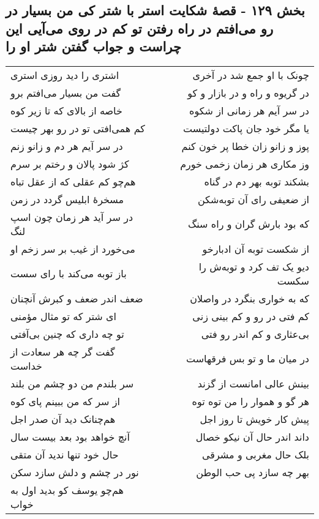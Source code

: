 \begin{center}
\section*{بخش ۱۲۹ - قصهٔ شکایت استر با شتر کی من بسیار در رو می‌افتم در راه رفتن تو کم در روی می‌آیی این چراست و جواب گفتن شتر او را}
\label{sec:sh129}
\begin{longtable}{l p{0.5cm} r}
اشتری را دید روزی استری
&&
چونک با او جمع شد در آخری
\\
گفت من بسیار می‌افتم برو
&&
در گریوه و راه و در بازار و کو
\\
خاصه از بالای که تا زیر کوه
&&
در سر آیم هر زمانی از شکوه
\\
کم همی‌افتی تو در رو بهر چیست
&&
یا مگر خود جان پاکت دولتیست
\\
در سر آیم هر دم و زانو زنم
&&
پوز و زانو زان خطا پر خون کنم
\\
کژ شود پالان و رختم بر سرم
&&
وز مکاری هر زمان زخمی خورم
\\
هم‌چو کم عقلی که از عقل تباه
&&
بشکند توبه بهر دم در گناه
\\
مسخرهٔ ابلیس گردد در زمن
&&
از ضعیفی رای آن توبه‌شکن
\\
در سر آید هر زمان چون اسپ لنگ
&&
که بود بارش گران و راه سنگ
\\
می‌خورد از غیب بر سر زخم او
&&
از شکست توبه آن ادبارخو
\\
باز توبه می‌کند با رای سست
&&
دیو یک تف کرد و توبه‌ش را سکست
\\
ضعف اندر ضعف و کبرش آنچنان
&&
که به خواری بنگرد در واصلان
\\
ای شتر که تو مثال مؤمنی
&&
کم فتی در رو و کم بینی زنی
\\
تو چه داری که چنین بی‌آفتی
&&
بی‌عثاری و کم اندر رو فتی
\\
گفت گر چه هر سعادت از خداست
&&
در میان ما و تو بس فرقهاست
\\
سر بلندم من دو چشم من بلند
&&
بینش عالی امانست از گزند
\\
از سر که من ببینم پای کوه
&&
هر گو و هموار را من توه توه
\\
هم‌چنانک دید آن صدر اجل
&&
پیش کار خویش تا روز اجل
\\
آنچ خواهد بود بعد بیست سال
&&
داند اندر حال آن نیکو خصال
\\
حال خود تنها ندید آن متقی
&&
بلک حال مغربی و مشرقی
\\
نور در چشم و دلش سازد سکن
&&
بهر چه سازد پی حب الوطن
\\
هم‌چو یوسف کو بدید اول به خواب

\end{longtable}
\end{center}
